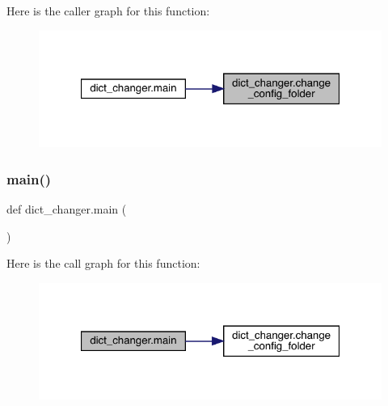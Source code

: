 Here is the caller graph for this function\+:\nopagebreak
\begin{figure}[H]
\begin{center}
\leavevmode
\includegraphics[width=321pt]{namespacedict__changer_a382eb9d6c06cff1b78fa410c33f36ee5_icgraph}
\end{center}
\end{figure}
\mbox{\label{namespacedict__changer_a5273383344c4ecafa4b588d5710e09e0}} 
\subsubsection{\texorpdfstring{main()}{main()}}
{\footnotesize\ttfamily def dict\+\_\+changer.\+main (\begin{DoxyParamCaption}{ }\end{DoxyParamCaption})}

Here is the call graph for this function\+:\nopagebreak
\begin{figure}[H]
\begin{center}
\leavevmode
\includegraphics[width=321pt]{namespacedict__changer_a5273383344c4ecafa4b588d5710e09e0_cgraph}
\end{center}
\end{figure}
